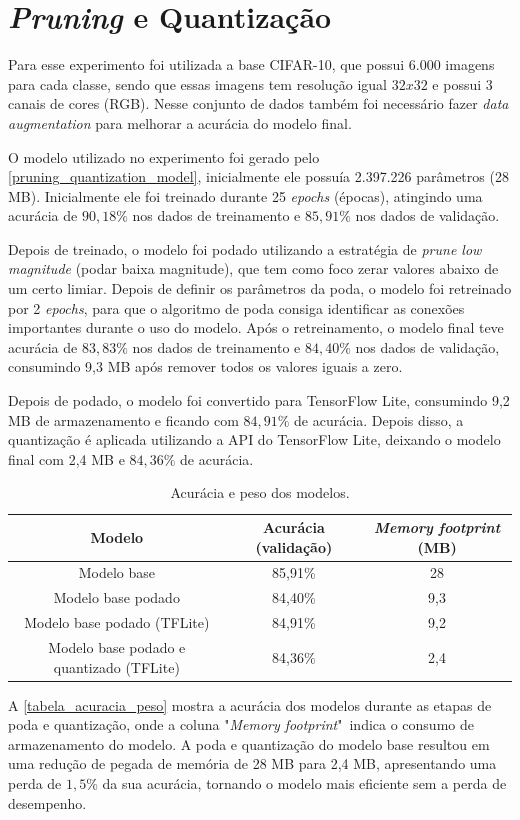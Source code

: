 \section{\textit{Pruning} e Quantização}

Para esse experimento foi utilizada a base CIFAR-10, que possui 6.000 imagens para cada classe, sendo que essas imagens
tem resolução igual $32x32$ e possui 3 canais de cores (RGB). Nesse conjunto de dados também foi necessário fazer
\textit{data augmentation} para melhorar a acurácia do modelo final.

O modelo utilizado no experimento foi gerado pelo \autoref{pruning_quantization_model}, inicialmente ele possuía
2.397.226 parâmetros (28 MB). Inicialmente ele foi treinado durante 25 \textit{epochs} (épocas), atingindo
uma acurácia de $90,18\%$ nos dados de treinamento e $85,91\%$ nos dados de validação.

Depois de treinado, o modelo foi podado utilizando a estratégia de \textit{prune low magnitude} (podar baixa magnitude),
que tem como foco zerar valores abaixo de um certo limiar. Depois de definir os parâmetros da poda, o modelo foi
retreinado por 2 \textit{epochs}, para que o algoritmo de poda consiga identificar as conexões importantes durante o
uso do modelo. Após o retreinamento, o modelo final teve acurácia de $83,83\%$ nos dados de treinamento e $84,40\%$
nos dados de validação, consumindo 9,3 MB após remover todos os valores iguais a zero.

Depois de podado, o modelo foi convertido para TensorFlow Lite, consumindo 9,2 MB de armazenamento e ficando com
$84,91\%$ de acurácia. Depois disso, a quantização é aplicada utilizando a API do TensorFlow Lite, deixando o modelo
final com 2,4 MB e $84,36\%$ de acurácia.

\begin{center}
\begin{table}[htb]
\centering
\ABNTEXfontereduzida
\caption[Acurácia e peso dos modelos]{Acurácia e peso dos modelos.}
\label{tabela_acuracia_peso}
\begin{tabular}{ |c|c|c| }
	\hline
	\textbf{Modelo} & \textbf{Acurácia (validação)}  & \textbf{\textit{Memory footprint} (MB)} \\
	\hline
	Modelo base 				 & 	85,91\% 	& 	28	\\
	Modelo base podado 			 & 	84,40\% 	& 	9,3	\\
	Modelo base podado (TFLite) 		 & 	84,91\% 	& 	9,2	\\
	Modelo base podado e quantizado (TFLite) & 	84,36\% 	& 	2,4	\\
	\hline
\end{tabular}
\end{table}
\end{center}

A \autoref{tabela_acuracia_peso} mostra a acurácia dos modelos durante as etapas de poda e quantização, onde a coluna
"\textit{Memory footprint}"\  indica o consumo de armazenamento do modelo.
A poda e quantização do modelo base resultou em uma redução de pegada de memória de 28 MB para 2,4 MB, apresentando uma perda
de $1,5\%$ da sua acurácia, tornando o modelo mais eficiente sem a perda de desempenho.
